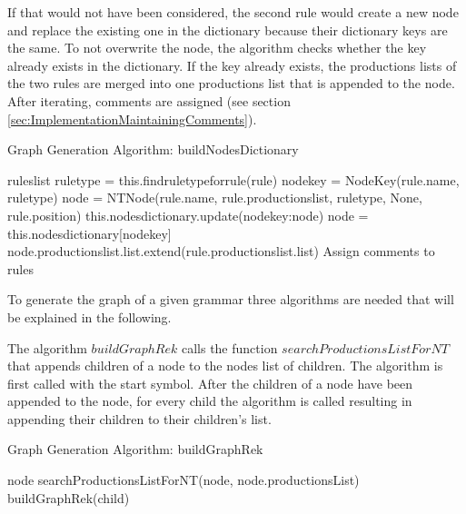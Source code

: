 If that would not have been considered, the second rule would create a new node and replace the existing one in the dictionary because their dictionary keys are the same. To not overwrite the node, the algorithm checks whether the key already exists in the dictionary. If the key already exists, the productions lists of the two rules are merged into one productions list that is appended to the node. 
After iterating, comments are assigned (see section \ref{sec:ImplementationMaintainingComments}).

\begin{algorithm}[H]
\caption{Graph Generation Algorithm: buildNodesDictionary}\label{alg:buildNodesDictionary}
\begin{algorithmic}[1] 
\Require rules\textunderscore list
		\State rule\textunderscore type = this.find\textunderscore rule\textunderscore type\textunderscore for\textunderscore rule(rule)
		\State node\textunderscore key = Node\textunderscore Key(rule.name, rule\textunderscore type)
			\State node = NTNode(rule.name, rule.productions\textunderscore list, rule\textunderscore type, None, rule.position)
			\State this.nodes\textunderscore dictionary.update({node\textunderscore key:node})
		\Else
			\State node = this.nodes\textunderscore dictionary[node\textunderscore key]
			\State node.productions\textunderscore list.list.extend(rule.productions\textunderscore list.list)
		\EndIf
	\EndIf
\EndFor
\State Assign comments to rules
\end{algorithmic}
\end{algorithm}

To generate the graph of a given grammar three algorithms are needed that will be explained in the following.

The algorithm $buildGraphRek$ calls the function $searchProductionsListForNT$ that appends children of a node to the nodes list of children.
The algorithm is first called with the start symbol.
After the children of a node have been appended to the node, for every child the algorithm is called resulting in appending their children to their children's list.

\begin{algorithm}[H]
\caption{Graph Generation Algorithm: buildGraphRek}
\begin{algorithmic}[1] 
\Require node
\State searchProductionsListForNT(node, node.productionsList)
		\State buildGraphRek(child)
	\EndFor
\EndIf
\end{algorithmic}
\end{algorithm}

